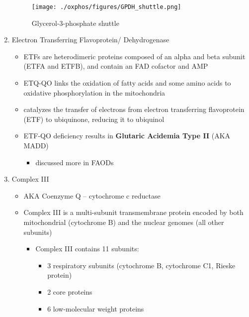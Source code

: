 \documentclass{scrartcl}
\begin{document}
\begin{enumerate}
\begin{figure}[htbp]
\centering
\texttt{[image: ./oxphos/figures/GPDH\_shuttle.png]}
\caption[g3ps]{\label{fig:orgefd5c23}
Glycerol-3-phosphate shuttle}
\end{figure}

\item Electron Transferring Flavoprotein/ Dehydrogenase
\label{sec:orgb226a73}
\begin{itemize}
\item ETFs are heterodimeric proteins composed of an alpha and beta
subunit (ETFA and ETFB), and contain an FAD cofactor and AMP

\item ETQ-QO links the oxidation of fatty acids and some amino acids to
oxidative phosphorylation in the mitochondria
\item catalyzes the transfer of electrons from electron transferring
flavoprotein (ETF) to ubiquinone, reducing it to ubiquinol
\end{itemize}

{\small{}}

\begin{itemize}
\item ETF-QO deficiency results in \textbf{Glutaric Acidemia Type II} (AKA MADD)
\begin{itemize}
\item discussed more in FAODs
\end{itemize}
\end{itemize}
\item Complex III
\label{sec:org11eb14c}
\begin{itemize}
\item AKA Coenzyme Q – cytochrome c reductase
\item Complex III is a multi-subunit transmembrane protein encoded by both
mitochondrial (cytochrome B) and the nuclear genomes (all other
subunits)

\begin{itemize}
\item Complex III contains 11 subunits:
\begin{itemize}
\item 3 respiratory subunits (cytochrome B, cytochrome C1, Rieske protein)
\item 2 core proteins
\item 6 low-molecular weight proteins
\end{itemize}
\end{itemize}


\end{itemize}
\end{enumerate}
\end{document}
